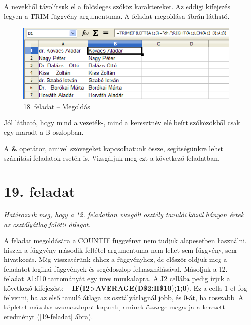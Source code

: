 A nevekből távolítsuk el a fölösleges szóköz
karaktereket. Az eddigi kifejezés legyen a TRIM függvény
argumentuma. A feladat megoldása  ábrán látható.

\begin{figure}[!h]
\begin{center}
\includegraphics[width=12.254cm]{oocalcv1-img92.png}
\caption{18. feladat -- Megoldás}\label{18-feladatMegoldás}
\end{center}
\end{figure}

Jól látható, hogy mind a vezeték-, mind a keresztnév elé
beírt szóközökből csak egy maradt a B oszlopban.

A \textbf{\&} operátor, amivel szövegeket kapcsolhatunk össze,
segítségünkre lehet számítási feladatok esetén is.
Vizsgáljuk meg ezt a következő feladatban.


\clearpage
\section{19. feladat}

{\itshape
Határozzuk meg, hogy a 12. feladatban vizsgált osztály tanulói
közül hányan értek az osztályátlag fölötti átlagot.}

A feladat megoldására a COUNTIF függvényt nem tudjuk alapesetben
használni, hiszen a függvény második feltétel argumentuma nem
lehet sem függvény, sem hivatkozás. Még visszatérünk ehhez
a függvényhez, de először oldjuk meg a feladatot logikai
függvények és segédoszlop felhasználásával. Másoljuk a
12. feladat A1:I10 tartományát egy üres munkalapra. A J2
cellába pedig írjuk a következő kifejezést:
\textsf{\textbf{=IF(I2>AVERAGE(D\$2:H\$10);1;0)}}.
Ez a cella 1-et fog felvenni, ha az első tanuló átlaga az
osztályátlagnál jobb, és 0-át, ha rosszabb. A képletet
másolva számoszlopot kapunk, aminek összege megadja a keresett
eredményt (\ref{19-feladat} ábra).

